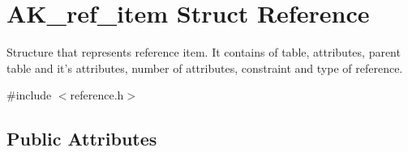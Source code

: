 \hypertarget{structAK__ref__item}{\section{A\+K\+\_\+ref\+\_\+item Struct Reference}
\label{structAK__ref__item}
}


Structure that represents reference item. It contains of table, attributes, parent table and it's attributes, number of attributes, constraint and type of reference.  




{\ttfamily \#include $<$reference.\+h$>$}

\subsection*{Public Attributes}
